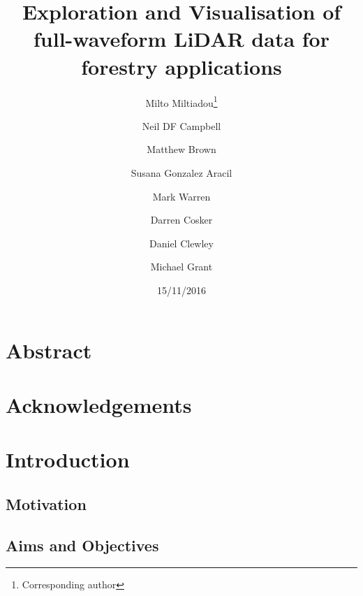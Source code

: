\documentclass{article}
\begin{document}
\begin{titlepage}
	\title{\textbf{Exploration and Visualisation of full-waveform LiDAR data for forestry applications}}
	\date {15/11/2016}
	\author [1,2,3]{Milto Miltiadou\thanks{Corresponding author}}
	\author [1]{Neil DF Campbell}
	\author [1]{Matthew Brown}
	\author [3]{Susana Gonzalez Aracil}
	\author [2]{Mark Warren}
	\author [1]{Darren Cosker}
	\author [2]{ Daniel Clewley}
	\author [2]{Michael Grant}
	\renewcommand\Authands{and}
	\renewcommand{\floatpagefraction}{1}%


 \maketitle
  

\end{titlepage}

\newpage
	\setcounter{secnumdepth}{0}
	\section{Abstract}\label{Abstract}
		
		\newpage
	\section{Acknowledgements}\label{Acknowledgments}
		
		\newpage
    \tableofcontents	 
		\newpage  
	\setcounter{secnumdepth}{4}	
	\section{Introduction} \label{Introduction}
	
			
		\subsection{Motivation} \label{Motivation}
				
			\subsection{Aims and Objectives}\label{Aims}
			
\end{document}
